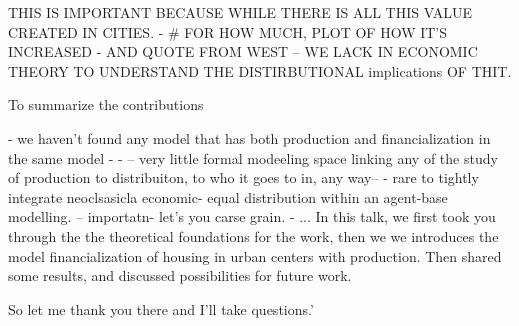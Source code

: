 THIS IS IMPORTANT BECAUSE WHILE THERE IS ALL THIS VALUE CREATED IN CITIES. - # FOR HOW MUCH, PLOT OF HOW IT'S INCREASED - AND QUOTE FROM WEST -- WE LACK IN ECONOMIC THEORY TO UNDERSTAND THE DISTIRBUTIONAL implications OF THIT.

To summarize the contributions

- we haven't found any model that has both production and financialization in the same model - 
- -- very little formal modeeling space linking any of the study of production to distribuiton, to who it goes to in, any way-- 
- rare to tightly integrate neoclsasicla economic- equal distribution within an agent-base modelling. -- importatn- let's you carse grain.
- ...
In this talk, we first took you through the the theoretical foundations for the work, then we we introduces the model financialization of housing in urban centers with production. Then shared some results, and  discussed possibilities for future work. 

So let me thank you there and I'll take questions.'

